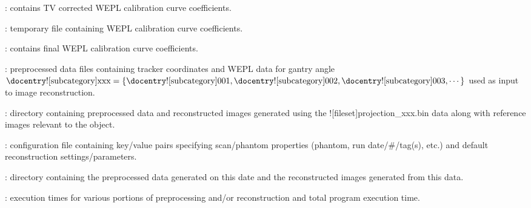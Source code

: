 \begin{tcbenvironment}
\begin{tcbparagraph}
\begin{ThinEnum}
\begin{ThinEnum}
\begin{ThinEnum}
\begin{ThinEnum}
\begin{ThinEnum}
\begin{ThinEnum}
\begin{ThinEnum}
                    			\item {} : contains TV corrected WEPL calibration curve coefficients.
						\item {} : temporary file containing WEPL calibration curve coefficients.
                                	\item {} : contains final WEPL calibration curve coefficients.
\newpage
                               	\item {} : preprocessed data files containing tracker coordinates and WEPL data for gantry angle $\text{\docentry![subcategory]{xxx}} =\{\text{\docentry![subcategory]{001}}, \text{\docentry![subcategory]{002}}, \text{\docentry![subcategory]{003}}, \cdots\}$ used as input to image reconstruction.
                                	\item {} : directory containing preprocessed data and reconstructed images generated using the \docentry![fileset]{projection\_xxx.bin} data along with reference images relevant to the object.
                                	\begin{ThinEnum}
                                    	\item {} : configuration file containing key/value pairs specifying scan/phantom properties
                                    (phantom, run date/\#/tag(s), etc.) and default reconstruction settings/parameters.
                    				\item {} : directory containing the preprocessed data generated on this date and the reconstructed images generated from this data.
                                    \begin{ThinEnum}
                                        	\item {} : execution times for various portions of preprocessing and/or reconstruction and total program execution time.

\end{ThinEnum}
\end{ThinEnum}
\end{ThinEnum}
\end{ThinEnum}
\end{ThinEnum}
\end{ThinEnum}
\end{ThinEnum}
\end{ThinEnum}
\end{ThinEnum}
\end{tcbparagraph}
\end{tcbenvironment}
